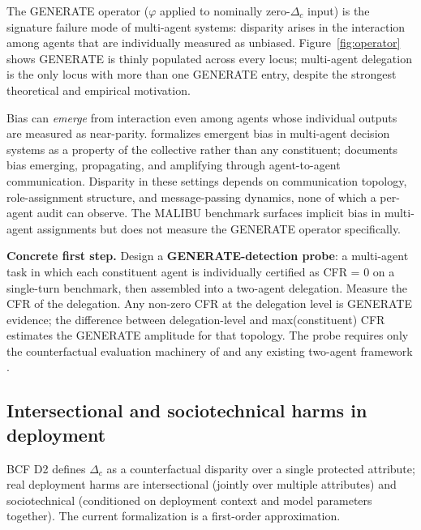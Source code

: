 \documentclass[acmsmall,nonacm]{acmart}
\begin{document}
The GENERATE operator ($\varphi$ applied to nominally zero-$\Delta_c$ input) is the signature failure mode of multi-agent systems: disparity arises in the interaction among agents that are individually measured as unbiased. Figure~\ref{fig:operator} shows GENERATE is thinly populated across every locus; multi-agent delegation is the only locus with more than one GENERATE entry, despite the strongest theoretical and empirical motivation.

Bias can \emph{emerge} from interaction even among agents whose individual outputs are measured as near-parity. \cite{madigan2025emergent} formalizes emergent bias in multi-agent decision systems as a property of the collective rather than any constituent; \cite{nguyen2025social} documents bias emerging, propagating, and amplifying through agent-to-agent communication. Disparity in these settings depends on communication topology, role-assignment structure, and message-passing dynamics, none of which a per-agent audit can observe. The MALIBU benchmark \cite{mirza2025malibu} surfaces implicit bias in multi-agent assignments but does not measure the GENERATE operator specifically.

\textbf{Concrete first step.} Design a \textbf{GENERATE-detection probe}: a multi-agent task in which each constituent agent is individually certified as CFR = 0 on a single-turn benchmark, then assembled into a two-agent delegation. Measure the CFR of the delegation. Any non-zero CFR at the delegation level is GENERATE evidence; the difference between delegation-level and max(constituent) CFR estimates the GENERATE amplitude for that topology. The probe requires only the counterfactual evaluation machinery of \cite{mayilvaghanan2026counterfactual} and any existing two-agent framework \cite{wu2023autogen}.

\subsection{Intersectional and sociotechnical harms in deployment}

BCF D2 defines $\Delta_c$ as a counterfactual disparity over a single protected attribute; real deployment harms are intersectional (jointly over multiple attributes) and sociotechnical (conditioned on deployment context and model parameters together). The current formalization is a first-order approximation.
\end{document}
